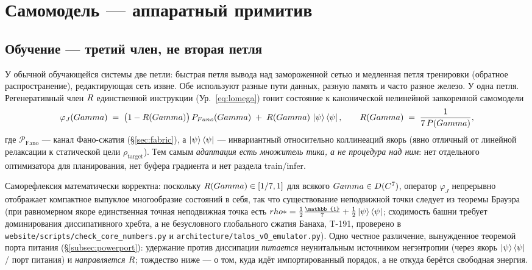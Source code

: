 \section{Самомодель --- аппаратный примитив}
\label{sec:selfmodel}

\subsection{Обучение --- третий член, не вторая петля}

У обычной обучающейся системы две петли: быстрая петля вывода над замороженной
сетью и медленная петля тренировки (обратное распространение), редактирующая
сеть извне. Обе используют разные пути данных, разную память и часто разное
железо. У \TALOS{} одна петля. Регенеративный член $R$ единственной
инструкции (Ур.~\ref{eq:lomega}) гонит состояние к канонической нелинейной
заякоренной самомодели
\begin{equation*}
\varphi_J(Gamma) \;=\; \bigl(1 - R(Gamma)\bigr)\,P_{Fano}(Gamma)
\;+\; R(Gamma)\,\ket{\psi}\bra{\psi},
\qquad R(Gamma) \;=\; \frac{1}{7\,P(Gamma)},
\end{equation*}
где $\mathcal{P}_{\mathrm{Fano}}$ --- канал Фано-сжатия (\S\ref{sec:fabric}),
а $\ket{\psi}\bra{\psi}$ --- инвариантный относительно коллинеаций якорь
(явно отличный от линейной релаксации к статической цели
$\rho_{\mathrm{target}}$). Тем самым \emph{адаптация есть множитель тика, а не
процедура над ним}: нет отдельного оптимизатора для планирования, нет буфера
градиента и нет раздела train/infer.

Саморефлексия математически корректна: поскольку $R(Gamma)\in[1/7,1]$ для
всякого $Gamma\in D(C^7)$, оператор $\varphi_J$ непрерывно
отображает компактное выпуклое многообразие состояний в себя, так что
существование неподвижной точки следует из теоремы Брауэра (при равномерном
якоре единственная точная неподвижная точка есть
$\rhostar = \tfrac12\tfrac{\mathbb{1}}{7} + \tfrac12\ket{\psi}\bra{\psi}$;
сходимость башни требует доминирования диссипативного хребта, а не безусловного
глобального сжатия Банаха, T-191, проверено в
\texttt{website/scripts/check\_core\_numbers.py} и
\texttt{architecture/talos\_v0\_emulator.py}). Одно честное различение,
вынужденное теоремой порта питания (\S\ref{subsec:powerport}): удержание против
диссипации \emph{питается} неунитальным источником негэнтропии (через якорь
$\ket{\psi}\bra{\psi}$ / порт питания) и \emph{направляется} $R$; тождество
ниже --- о том, куда идёт импортированный порядок, а не откуда берётся свободная
энергия.

